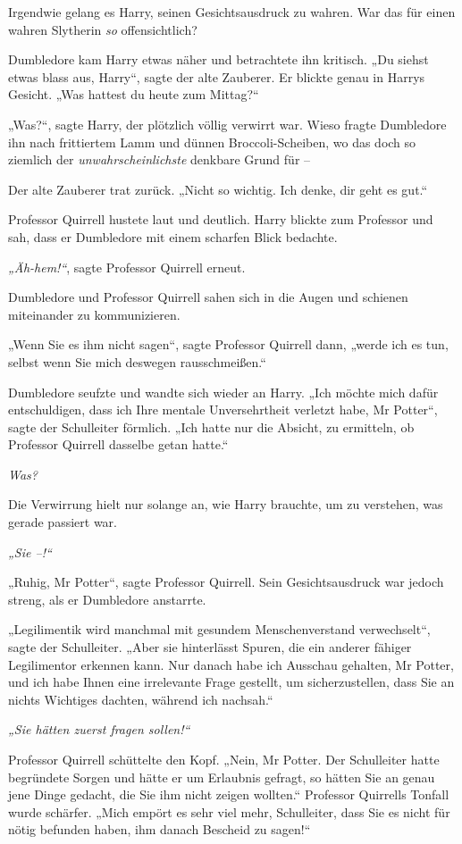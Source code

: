 {Irgendwie gelang es Harry, seinen Gesichtsausdruck zu wahren. War das für einen wahren Slytherin \emph{so} offensichtlich?

Dumbledore kam Harry etwas näher und betrachtete ihn kritisch. „Du siehst etwas blass aus, Harry“, sagte der alte Zauberer. Er blickte genau in Harrys Gesicht. „Was hattest du heute zum Mittag?“

„Was?“, sagte Harry, der plötzlich völlig verwirrt war. Wieso fragte Dumbledore ihn nach frittiertem Lamm und dünnen Broccoli-Scheiben, wo das doch so ziemlich der \emph{unwahrscheinlichste} denkbare Grund für --

Der alte Zauberer trat zurück. „Nicht so wichtig. Ich denke, dir geht es gut.“

Professor Quirrell hustete laut und deutlich. Harry blickte zum Professor und sah, dass er Dumbledore mit einem scharfen Blick bedachte.

\emph{„Äh-hem!“}, sagte Professor Quirrell erneut.

Dumbledore und Professor Quirrell sahen sich in die Augen und schienen miteinander zu kommunizieren.

„Wenn Sie es ihm nicht sagen“, sagte Professor Quirrell dann, „werde ich es tun, selbst wenn Sie mich deswegen rausschmeißen.“

Dumbledore seufzte und wandte sich wieder an Harry. „Ich möchte mich dafür entschuldigen, dass ich Ihre mentale Unversehrtheit verletzt habe, Mr Potter“, sagte der Schulleiter förmlich. „Ich hatte nur die Absicht, zu ermitteln, ob Professor Quirrell dasselbe getan hatte.“

\emph{Was?}

Die Verwirrung hielt nur solange an, wie Harry brauchte, um zu verstehen, was gerade passiert war.

\emph{„Sie --!“}

„Ruhig, Mr Potter“, sagte Professor Quirrell. Sein Gesichtsausdruck war jedoch streng, als er Dumbledore anstarrte.

„Legilimentik wird manchmal mit gesundem Menschenverstand verwechselt“, sagte der Schulleiter. „Aber sie hinterlässt Spuren, die ein anderer fähiger Legilimentor erkennen kann. Nur danach habe ich Ausschau gehalten, Mr Potter, und ich habe Ihnen eine irrelevante Frage gestellt, um sicherzustellen, dass Sie an nichts Wichtiges dachten, während ich nachsah.“

\emph{„Sie hätten zuerst fragen sollen!“}

Professor Quirrell schüttelte den Kopf. „Nein, Mr Potter. Der Schulleiter hatte begründete Sorgen und hätte er um Erlaubnis gefragt, so hätten Sie an genau jene Dinge gedacht, die Sie ihm nicht zeigen wollten.“ Professor Quirrells Tonfall wurde schärfer. „Mich empört es sehr viel mehr, Schulleiter, dass Sie es nicht für nötig befunden haben, ihm danach Bescheid zu sagen!“

}
